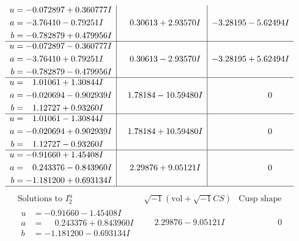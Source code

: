 \documentclass[1p]{elsarticle_modified}
\theoremstyle{definition}
\newcommand{\I}{\sqrt{-1}}
\begin{document}
$$\begin{array}{c|c|c}
\begin{aligned}
u &= -0.072897 + 0.360777 I \\
a &= -3.76410 - 0.79251 I \\
b &= -0.782879 + 0.479956 I\end{aligned}
 & \phantom{-}0.30613 + 2.93570 I & -3.28195 - 5.62494 I \\ \hline\begin{aligned}
u &= -0.072897 - 0.360777 I \\
a &= -3.76410 + 0.79251 I \\
b &= -0.782879 - 0.479956 I\end{aligned}
 & \phantom{-}0.30613 - 2.93570 I & -3.28195 + 5.62494 I \\ \hline\begin{aligned}
u &= \phantom{-}1.01061 + 1.30844 I \\
a &= -0.020694 - 0.902939 I \\
b &= \phantom{-}1.12727 + 0.93260 I\end{aligned}
 & \phantom{-}1.78184 - 10.59480 I & \phantom{-0.000000 } 0 \\ \hline\begin{aligned}
u &= \phantom{-}1.01061 - 1.30844 I \\
a &= -0.020694 + 0.902939 I \\
b &= \phantom{-}1.12727 - 0.93260 I\end{aligned}
 & \phantom{-}1.78184 + 10.59480 I & \phantom{-0.000000 } 0 \\ \hline\begin{aligned}
u &= -0.91660 + 1.45408 I \\
a &= \phantom{-}0.243376 - 0.843960 I \\
b &= -1.181200 + 0.693134 I\end{aligned}
 & \phantom{-}2.29876 + 9.05121 I & \phantom{-0.000000 } 0\\
 \hline 
 \end{array}$$\newpage$$\begin{array}{c|c|c}  
\text{Solutions to }I^u_{2}& \I (\text{vol} + \sqrt{-1}CS) & \text{Cusp shape}\\
 \hline 
\begin{aligned}
u &= -0.91660 - 1.45408 I \\
a &= \phantom{-}0.243376 + 0.843960 I \\
b &= -1.181200 - 0.693134 I\end{aligned}
 & \phantom{-}2.29876 - 9.05121 I & \phantom{-0.000000 } 0 \\ \hline\begin{aligned}

\end{aligned}
\end{array}$$
\end{document}
